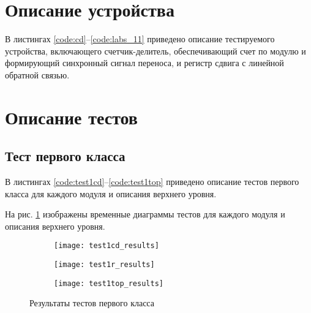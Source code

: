 \section{Описание устройства}

В листингах \ref{code:cd}--\ref{code:labs_11} приведено описание тестируемого устройства, включающего счетчик-делитель, обеспечивающий счет по модулю  и формирующий синхронный сигнал переноса, и регистр сдвига с линейной обратной связью.




\section{Описание тестов}
\label{sec:tests}

\subsection{Тест первого класса}

В листингах \ref{code:test1cd}--\ref{code:test1top} приведено описание тестов первого класса для каждого модуля и описания верхнего уровня.


\newpage


На рис. \ref{fig:test1_results} изображены временные диаграммы тестов для каждого модуля и описания верхнего уровня.
\vspace{-0.3cm}
\begin{figure}[H]
	\begin{subfigure}{\textwidth}
		\centering
		\texttt{[image: test1cd\_results]}
		\vspace{0.1cm}
	\end{subfigure}
	\begin{subfigure}{\textwidth}
		\centering
		\texttt{[image: test1r\_results]}
		\vspace{0.1cm}
	\end{subfigure}
	\begin{subfigure}{\textwidth}
		\centering
		\texttt{[image: test1top\_results]}
	\end{subfigure}
	\caption{Результаты тестов первого класса}
	\label{fig:test1_results}
\end{figure}

